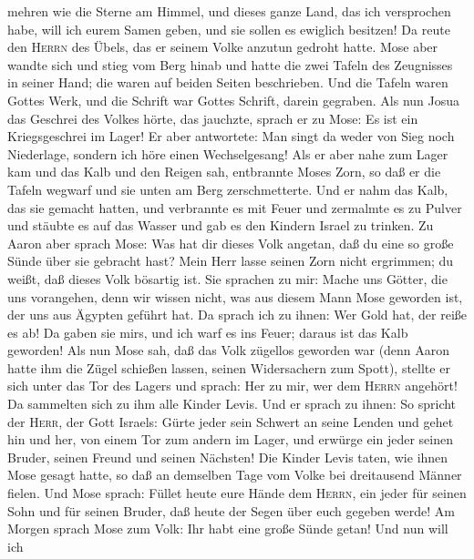 mehren wie die Sterne am Himmel, und dieses ganze Land, das ich
versprochen habe, will ich eurem Samen geben, und sie sollen es ewiglich
besitzen!  Da reute den \textsc{Herrn} des Übels, das er
seinem Volke anzutun gedroht hatte.  Mose aber wandte
sich und stieg vom Berg hinab und hatte die zwei Tafeln des Zeugnisses
in seiner Hand; die waren auf beiden Seiten beschrieben. 
Und die Tafeln waren Gottes Werk, und die Schrift war Gottes Schrift,
darein gegraben.  Als nun Josua das Geschrei des Volkes
hörte, das jauchzte, sprach er zu Mose: Es ist ein Kriegsgeschrei im
Lager!  Er aber antwortete: Man singt da weder von Sieg
noch Niederlage, sondern ich höre einen Wechselgesang! 
Als er aber nahe zum Lager kam und das Kalb und den Reigen sah,
entbrannte Moses Zorn, so daß er die Tafeln wegwarf und sie unten am
Berg zerschmetterte.  Und er nahm das Kalb, das sie
gemacht hatten, und verbrannte es mit Feuer und zermalmte es zu Pulver
und stäubte es auf das Wasser und gab es den Kindern Israel zu trinken.
 Zu Aaron aber sprach Mose: Was hat dir dieses Volk
angetan, daß du eine so große Sünde über sie gebracht hast?
 Mein Herr lasse seinen Zorn nicht ergrimmen; du weißt,
daß dieses Volk bösartig ist.  Sie sprachen zu mir: Mache
uns Götter, die uns vorangehen, denn wir wissen nicht, was aus diesem
Mann Mose geworden ist, der uns aus Ägypten geführt hat. 
Da sprach ich zu ihnen: Wer Gold hat, der reiße es ab! Da gaben sie
mir\textquotesingle s, und ich warf es ins Feuer; daraus ist das Kalb
geworden!  Als nun Mose sah, daß das Volk zügellos
geworden war (denn Aaron hatte ihm die Zügel schießen lassen, seinen
Widersachern zum Spott),  stellte er sich unter das Tor
des Lagers und sprach: Her zu mir, wer dem \textsc{Herrn} angehört! Da
sammelten sich zu ihm alle Kinder Levis.  Und er sprach
zu ihnen: So spricht der \textsc{Herr}, der Gott Israels: Gürte jeder
sein Schwert an seine Lenden und gehet hin und her, von einem Tor zum
andern im Lager, und erwürge ein jeder seinen Bruder, seinen Freund und
seinen Nächsten!  Die Kinder Levis taten, wie ihnen Mose
gesagt hatte, so daß an demselben Tage vom Volke bei dreitausend Männer
fielen.  Und Mose sprach: Füllet heute eure Hände dem
\textsc{Herrn}, ein jeder für seinen Sohn und für seinen Bruder, daß
heute der Segen über euch gegeben werde!  Am Morgen
sprach Mose zum Volk: Ihr habt eine große Sünde getan! Und nun will ich
